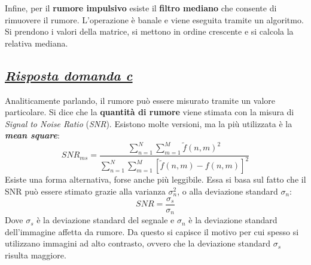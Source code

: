 \documentclass[a4paper]{article}
\begin{document}
	\noindent
	Infine, per il \textbf{rumore impulsivo} esiste il \textbf{filtro mediano} che consente di rimuovere il rumore. L'operazione è banale e viene eseguita tramite un algoritmo. Si prendono i valori della matrice, si mettono in ordine crescente e si calcola la relativa mediana.\newpage
	
	\subsection*{\textcolor{Green4}{\emph{\underline{Risposta domanda c}}}}
	
	Analiticamente parlando, il rumore può essere misurato tramite un valore particolare. Si dice che la \textbf{quantità di rumore} viene stimata con la misura di \emph{Signal to Noise Ratio} (\emph{SNR}). Esistono molte versioni, ma la più utilizzata è la \emph{\textbf{mean square}}:
	\begin{equation*}
		SNR_{ms} = \dfrac{
			\displaystyle\sum_{n=1}^{N}\sum_{m=1}^{M} \tilde{f}\left(n,m\right)^{2}
		}{
			\displaystyle\sum_{n=1}^{N}\sum_{m=1}^{M} \left[\tilde{f}\left(n,m\right) - f\left(n,m\right)\right]^{2}
		}
	\end{equation*}
	Esiste una forma alternativa, forse anche più leggibile. Essa si basa sul fatto che il SNR può essere stimato grazie alla varianza $\sigma^{2}_{n}$, o alla deviazione standard $\sigma_{n}$:
	\begin{equation*}
		SNR = \dfrac{\sigma_{s}}{\sigma_{n}}
	\end{equation*}
	Dove $\sigma_{s}$ è la deviazione standard del segnale e $\sigma_{n}$ è la deviazione standard dell'immagine affetta da rumore. Da questo si capisce il motivo per cui spesso si utilizzano immagini ad alto contrasto, ovvero che la deviazione standard $\sigma_{s}$ risulta maggiore.
\end{document}
